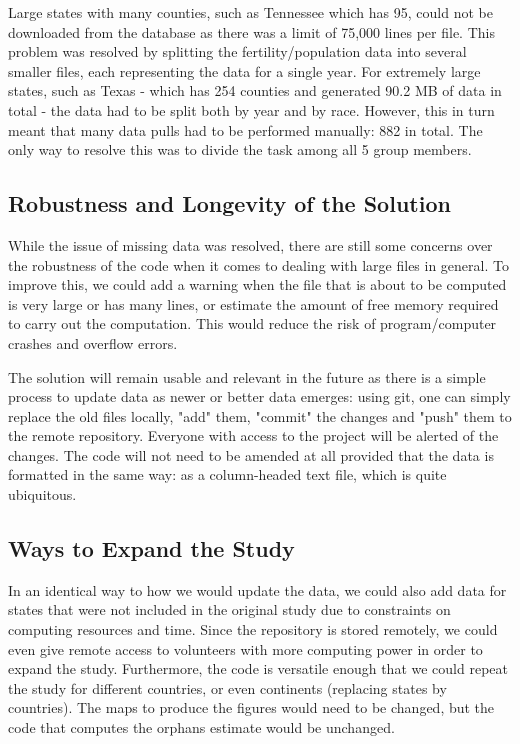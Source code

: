 \documentclass[11pt]{article}
\begin{document}
Large states with many counties, such as Tennessee which has 95, could not be downloaded from the database as there was a limit of 75,000 lines per file. This problem was resolved by splitting the fertility/population data into several smaller files, each representing the data for a single year. For extremely large states, such as Texas - which has 254 counties and generated 90.2 MB of data in total - the data had to be split both by year and by race. However, this in turn meant that many data pulls had to be performed manually: 882 in total. The only way to resolve this was to divide the task among all 5 group members.

\subsection{Robustness and Longevity of the Solution}
While the issue of missing data was resolved, there are still some concerns over the robustness of the code when it comes to dealing with large files in general. To improve this, we could add a warning when the file that is about to be computed is very large or has many lines, or estimate the amount of free memory required to carry out the computation. This would reduce the risk of program/computer crashes and overflow errors.

The solution will remain usable and relevant in the future as there is a simple process to update data as newer or better data emerges: using git, one can simply replace the old files locally, "add" them, "commit" the changes and "push" them to the remote repository. Everyone with access to the project will be alerted of the changes. The code will not need to be amended at all provided that the data is formatted in the same way: as a column-headed text file, which is quite ubiquitous.

\subsection{Ways to Expand the Study}
In an identical way to how we would update the data, we could also add data for states that were not included in the original study due to constraints on computing resources and time. Since the repository is stored remotely, we could even give remote access to volunteers with more computing power in order to expand the study. Furthermore, the code is versatile enough that we could repeat the study for different countries, or even continents (replacing states by countries). The maps to produce the figures would need to be changed, but the code that computes the orphans estimate would be unchanged.
\end{document}
